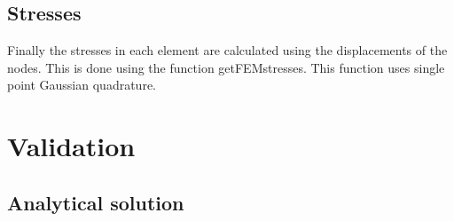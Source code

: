 \documentclass[11pt]{article}
\begin{document}
\subsection{Stresses}
Finally the stresses in each element are calculated using the displacements of the nodes. This is done using the function get\textunderscore FEM\textunderscore stresses. This function uses single point Gaussian quadrature.

\section{Validation}

\subsection{Analytical solution}
\end{document}
